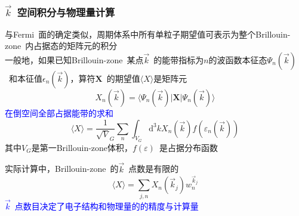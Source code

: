 \documentclass[cjk,slidestop,compress,mathserif,blue]{beamer}
\begin{document}
\frame
{
\frametitle{$\vec k$~空间积分与物理量计算}
与\textrm{Fermi~}面的确定类似，周期体系中所有单粒子期望值可表示为整个\textrm{Brillouin-zone~}内占据态的矩阵元的积分\\

一般地，如果已知\textrm{Brillouin-zone~}某点$\vec k$~的能带指标为$n$的波函数本征态$\Psi_n(\vec k)$~和本征值$\epsilon_n(\vec k)$，算符$\mathbf{X}$~的期望值$\langle X \rangle$是矩阵元
\begin{displaymath}
	X_n(\vec k)=\langle\Psi_n(\vec k)|\mathbf{X}|\Psi_n(\vec k)\rangle 
\end{displaymath}
\textcolor{blue}{在倒空间全部占据能带的求和}
\begin{displaymath}
	\langle X\rangle=\dfrac1{\sqrt V_G}\sum_n\int_{V_G}\mathrm{d}^3kX_n(\vec k)f(\varepsilon_n(\vec k))
\end{displaymath}
其中$V_G$是第一\textrm{Brillouin-zone}体积，$f(\varepsilon)$~是占据分布函数

实际计算中，\textrm{Brillouin-zone~}的$\vec k$~点数是有限的
\begin{displaymath}
	\langle X\rangle=\sum_{j,n}X_n(\vec k_j)w_n^{\vec k_j}
\end{displaymath} 
\textcolor{blue}{$\vec k$~点数目决定了电子结构和物理量的的精度与计算量}
}
\end{document}
